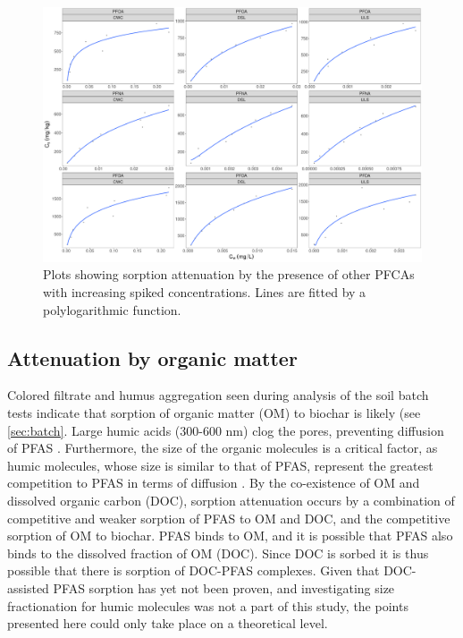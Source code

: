 \begin{figure}
    \centering
    \includegraphics[width=\textwidth]{R/figs/BC_single_attenuation.pdf}
    \caption{Plots showing sorption attenuation by the presence of other PFCAs with increasing spiked concentrations. Lines are fitted by a polylogarithmic function.}
    \label{fig:nonlinear_OND} 
\end{figure}

\subsection{Attenuation by organic matter} 
Colored filtrate and humus aggregation seen during analysis of the soil batch tests indicate that sorption of organic matter (OM) to biochar is likely (see \cref{sec:batch}. Large humic acids (300-600 nm) clog the pores, preventing diffusion of PFAS \citep{Cornelissen2006,kluvcakova2018size}. Furthermore, the size of the organic molecules is a critical factor, as humic molecules, whose size is similar to that of PFAS, represent the greatest competition to PFAS in terms of diffusion \citep{du2014adsorption}. By the co-existence of OM and dissolved organic carbon (\acrshort{DOC}), sorption attenuation occurs by a combination of competitive and weaker sorption of PFAS to OM and DOC, and the competitive sorption of OM to biochar. PFAS binds to OM, and it is possible that PFAS also binds to the dissolved fraction of OM (DOC). Since DOC is sorbed it is thus possible that there is sorption of DOC-PFAS complexes. Given that DOC-assisted PFAS sorption has yet not been proven, and investigating size fractionation for humic molecules was not a part of this study, the points presented here could only take place on a theoretical level.




